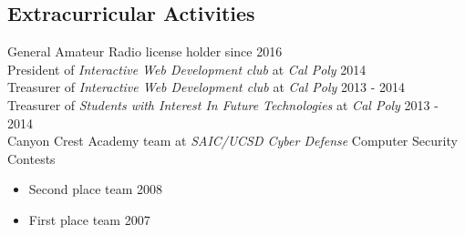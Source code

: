 \documentclass[line]{docs/resume/res}
\begin{document}
\begin{resume}
\section{Extracurricular Activities}
  General Amateur Radio license holder since \hfill 2016 \\
  President of {\it Interactive Web Development club} at {\it Cal Poly} \hfill 2014 \\
  Treasurer of {\it Interactive Web Development club} at {\it Cal Poly} \hfill 2013 - 2014 \\
  Treasurer of {\it Students with Interest In Future Technologies} at {\it Cal Poly} \hfill 2013 - 2014 \\
  Canyon Crest Academy team at {\it SAIC/UCSD Cyber Defense} Computer Security Contests
  \begin{itemize} \itemsep -2pt
    \item Second place team \hfill 2008
    \item First place team \hfill 2007
  \end{itemize}

\end{resume}
\end{document}

